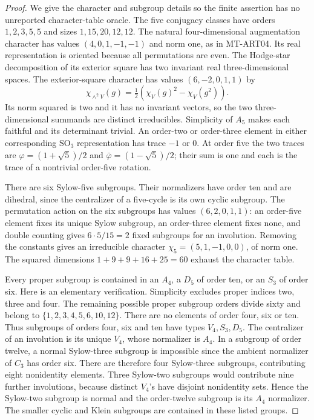 \documentclass[11pt,a4paper]{article}
\begin{document}
\begin{proof}
We give the character and subgroup details so the finite assertion has
no unreported character-table oracle. The five conjugacy classes have
orders $1,2,3,5,5$ and sizes $1,15,20,12,12$. The natural four-dimensional
augmentation character has values $(4,0,1,-1,-1)$ and norm one, as in
MT-ART04. Its real representation is oriented because all permutations
are even. The Hodge-star decomposition of its exterior square has two
invariant real three-dimensional spaces. The exterior-square character
has values $(6,-2,0,1,1)$ by
\[
 \chi_{\wedge^2 V}(g)=\tfrac12(\chi_V(g)^2-\chi_V(g^2)).
\]
Its norm squared is two and it has no invariant vectors, so the two
three-dimensional summands are distinct irreducibles. Simplicity of
$A_5$ makes each faithful and its determinant trivial. An order-two or
order-three element in either corresponding $\mathrm{SO}_3$ representation
has trace $-1$ or $0$. At order five the two traces are
$\varphi=(1+\sqrt5)/2$ and $\bar\varphi=(1-\sqrt5)/2$; their sum is
one and each is the trace of a nontrivial order-five rotation.

There are six Sylow-five subgroups. Their normalizers have order ten
and are dihedral, since the centralizer of a five-cycle is its own
cyclic subgroup. The permutation action on the six subgroups has
values $(6,2,0,1,1)$: an order-five element fixes its unique Sylow
subgroup, an order-three element fixes none, and double counting gives
$6\cdot5/15=2$ fixed subgroups for an involution. Removing the constants
gives an irreducible character $\chi_5=(5,1,-1,0,0)$, of norm one.
The squared dimensions $1+9+9+16+25=60$ exhaust the character table.

Every proper subgroup is contained in an $A_4$, a $D_5$ of order ten,
or an $S_3$ of order six. Here is an elementary verification. Simplicity
excludes proper indices two, three and four. The remaining possible
proper subgroup orders divide sixty and belong to
$\{1,2,3,4,5,6,10,12\}$. There are no elements of order four, six or
ten. Thus subgroups of orders four, six and ten have types
$V_4,S_3,D_5$. The centralizer of an involution is its unique $V_4$,
whose normalizer is $A_4$. In a subgroup of order twelve, a normal
Sylow-three subgroup is impossible since the ambient normalizer of
$C_3$ has order six. There are therefore four Sylow-three subgroups,
contributing eight nonidentity elements. Three Sylow-two subgroups
would contribute nine further involutions, because distinct $V_4$'s
have disjoint nonidentity sets. Hence the Sylow-two subgroup is normal
and the order-twelve subgroup is its $A_4$ normalizer. The smaller
cyclic and Klein subgroups are contained in these listed groups.


\end{proof}
\end{document}
